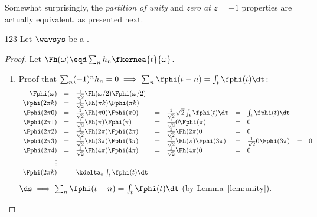 Somewhat surprisingly, the {\em partition of unity} and
{\em zero at $z=-1$} properties are actually
equivalent, as presented next.
\begin{theorem}
\label{thm:zero_unity_evenodd}
\citep{chui}{123}
Let $\wavsys$ be a .
\end{theorem}
\begin{proof}
Let $\Fh(\omega)\eqd\sum_n  h_n \fkernea{t}{\omega}$.
\begin{enumerate}
\item Proof that $\sum_n(-1)^n  h_n =0 \implies \sum_n\fphi(t-n)=\int_t\fphi(t)\dt$:
\[\begin{array}{rclllllll}
  \Fphi(\omega) &=& \frac{1}{\sqrt{2}}\Fh(\omega/2) \Fphi(\omega/2) \\
  \Fphi(2\pi k) &=& \frac{1}{\sqrt{2}}\Fh(\pi k) \Fphi(\pi k) \\
  \Fphi(2\pi 0) &=& \frac{1}{\sqrt{2}}\Fh(\pi 0) \Fphi(\pi 0)
                &=& \frac{1}{\sqrt{2}}\sqrt{2}   \int_t\fphi(t)\dt
                &=& \int_t\fphi(t)\dt \\
  \Fphi(2\pi 1) &=& \frac{1}{\sqrt{2}}\Fh(\pi ) \Fphi(\pi )
                &=& \frac{1}{\sqrt{2}} 0 \Fphi(\pi )
                &=& 0 \\
  \Fphi(2\pi 2) &=& \frac{1}{\sqrt{2}}\Fh(2\pi ) \Fphi(2\pi )
                &=& \frac{1}{\sqrt{2}}\Fh(2\pi ) 0
                &=& 0 \\
  \Fphi(2\pi 3) &=& \frac{1}{\sqrt{2}}\Fh(3\pi ) \Fphi(3\pi )
                &=& \frac{1}{\sqrt{2}}\Fh(\pi ) \Fphi(3\pi )
                &=& \frac{1}{\sqrt{2}} 0 \Fphi(3\pi )
                &=& 0 \\
  \Fphi(2\pi 4) &=& \frac{1}{\sqrt{2}}\Fh(4\pi ) \Fphi(4\pi )
                &=& \frac{1}{\sqrt{2}}\Fh(4\pi ) 0
                &=& 0 \\
  \vdots \\
  \Fphi(2\pi k) &=& \kdelta_k \int_t\fphi(t)\dt
\end{array}\]
$\ds \implies \sum_n \fphi(t-n)=\int_t\fphi(t)\dt$
(by Lemma~\ref{lem:unity}).
\fi


\end{enumerate}
\end{proof}
